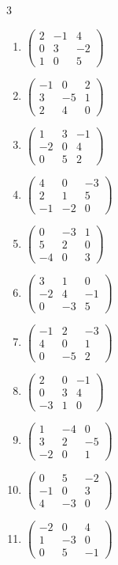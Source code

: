 \begin{multicols}{3}
\begin{enumerate}[label=\arabic*.,  leftmargin=*]
\item $\begin{pmatrix}2&-1&4\\0&3&-2\\1&0&5\end{pmatrix}$
\item $\begin{pmatrix}-1&0&2\\3&-5&1\\2&4&0\end{pmatrix}$
\item $\begin{pmatrix}1&3&-1\\-2&0&4\\0&5&2\end{pmatrix}$
\item $\begin{pmatrix}4&0&-3\\2&1&5\\-1&-2&0\end{pmatrix}$
\item $\begin{pmatrix}0&-3&1\\5&2&0\\-4&0&3\end{pmatrix}$
\item $\begin{pmatrix}3&1&0\\-2&4&-1\\0&-3&5\end{pmatrix}$
\item $\begin{pmatrix}-1&2&-3\\4&0&1\\0&-5&2\end{pmatrix}$
\item $\begin{pmatrix}2&0&-1\\0&3&4\\-3&1&0\end{pmatrix}$
\item $\begin{pmatrix}1&-4&0\\3&2&-5\\-2&0&1\end{pmatrix}$
\item $\begin{pmatrix}0&5&-2\\-1&0&3\\4&-3&0\end{pmatrix}$
\item $\begin{pmatrix}-2&0&4\\1&-3&0\\0&5&-1\end{pmatrix}$

\end{enumerate}
\end{multicols}
